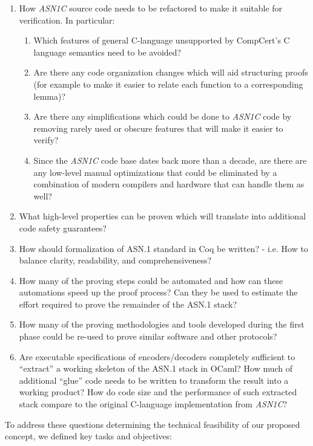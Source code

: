 \documentclass[10p,conference]{IEEEtran}
\begin{document}
\begin{enumerate}
\item How \emph{ASN1C} source code needs to be refactored to make it suitable for verification. In particular:
  \begin{enumerate}
  \item Which features of general C-language unsupported by CompCert's C language semantics need to be avoided?
  \item Are there any code organization changes which will aid structuring proofs (for example to make it easier to relate each function to a corresponding lemma)?
  \item Are there any simplifications which could be done to \emph{ASN1C} code by removing rarely used or obscure features that will make it easier to verify?
  \item Since the \emph{ASN1C} code base dates back more than a decade, are there are any low-level manual optimizations that could be eliminated by a combination of modern compilers and hardware that can handle them as well?
  \end{enumerate}
\item What high-level properties can be proven which will translate into additional code safety guarantees?
\item How should formalization of ASN.1 standard in Coq be written? - i.e. How to balance clarity, readability, and comprehensiveness?
\item How many of the proving steps could be automated and how can these automations speed up the proof process? Can they be used to estimate the effort required to prove the remainder of the ASN.1 stack?
\item How many of the proving methodologies and tools developed during the first phase could be re-used to prove similar software and other
  protocols?
  \item Are executable specifications of encoders/decoders completely sufficient to ``extract'' a working skeleton of the ASN.1 stack in OCaml? How much of additional ``glue'' code needs to be written to transform the result into a working product? How do code size and the performance of such extracted stack compare to the original C-language implementation from \emph{ASN1C}?  
\end{enumerate}

To address these questions determining the technical feasibility of
our proposed concept, we defined key tasks and objectives:

 
\end{document}
